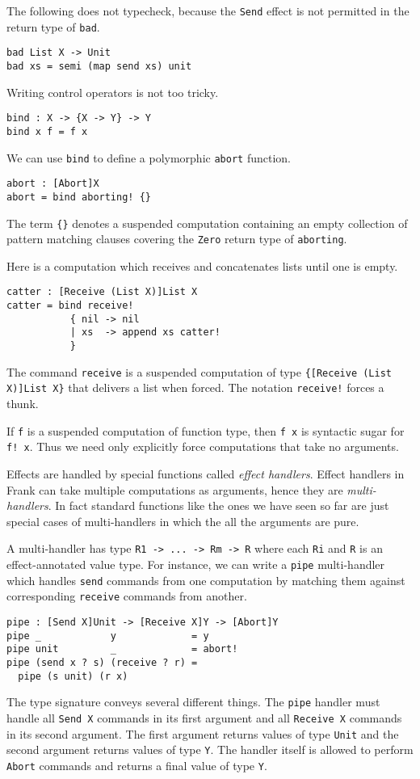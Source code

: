 \documentclass[preprint]{sigplanconf}
\begin{document}
The following does not typecheck, because the \verb!Send! effect is
not permitted in the return type of \verb!bad!.

\begin{verbatim}
bad List X -> Unit
bad xs = semi (map send xs) unit
\end{verbatim}

Writing control operators is not too tricky.
\begin{verbatim}
bind : X -> {X -> Y} -> Y
bind x f = f x
\end{verbatim}

We can use \verb!bind! to define a polymorphic \verb!abort! function.
\begin{verbatim}
abort : [Abort]X
abort = bind aborting! {}
\end{verbatim}
The term \verb!{}! denotes a suspended computation containing an empty
collection of pattern matching clauses covering the \verb!Zero! return
type of \verb!aborting!.

Here is a computation which receives and concatenates lists until one
is empty.
%
\begin{verbatim}
catter : [Receive (List X)]List X
catter = bind receive!
           { nil -> nil
           | xs  -> append xs catter!
           }
\end{verbatim}
%
The command \verb!receive! is a suspended computation of type
\verb!{[Receive (List X)]List X}! that delivers a list when
forced. The notation \verb|receive!| forces a thunk.

If \verb!f! is a suspended computation of function type, then
\verb!f x! is syntactic sugar for \verb|f! x|. Thus we need only
explicitly force computations that take no arguments.

Effects are handled by special functions called \emph{effect
  handlers}. Effect handlers in Frank can take multiple computations
as arguments, hence they are \emph{multi-handlers}. In fact standard
functions like the ones we have seen so far are just special cases of
multi-handlers in which the all the arguments are pure.

A multi-handler has type \verb!R1 -> ... -> Rm -> R! where each
\verb!Ri! and \verb!R! is an effect-annotated value type. For
instance, we can write a \verb!pipe! multi-handler which handles
\verb!send! commands from one computation by matching them against
corresponding \verb!receive! commands from another.
%
\begin{verbatim}
pipe : [Send X]Unit -> [Receive X]Y -> [Abort]Y
pipe _            y             = y
pipe unit         _             = abort!
pipe (send x ? s) (receive ? r) =
  pipe (s unit) (r x)
\end{verbatim}
%
The type signature conveys several different things. The \verb!pipe!
  handler must handle all \verb!Send X! commands in its first argument
  and all \verb!Receive X! commands in its second argument. The first
  argument returns values of type \verb!Unit! and the second argument
  returns values of type \verb!Y!. The handler itself is allowed to
  perform \verb!Abort!  commands and returns a final value of type
  \verb!Y!.
\end{document}

